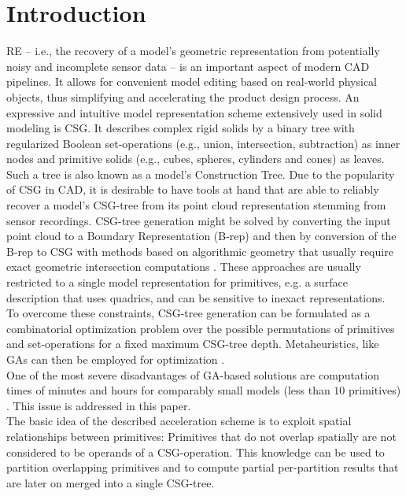 \section{Introduction}
\ac{RE} -- i.e., the recovery of a model's geometric representation from potentially noisy and incomplete sensor data -- is an important aspect of modern \ac{CAD} pipelines. 
It allows for convenient model editing based on real-world physical objects, thus simplifying and accelerating the product design process.
An expressive and intuitive model representation scheme extensively used in solid modeling is \ac{CSG}.
It describes complex rigid solids by a binary tree with regularized Boolean set-operations (e.g., union, intersection, subtraction) as inner nodes and primitive solids (e.g., cubes, spheres, cylinders and cones) as leaves. 
Such a tree is also known as a model's Construction Tree.
Due to the popularity of \ac{CSG} in \ac{CAD}, it is desirable to have tools at hand that are able to reliably recover a model's \ac{CSG}-tree from its point cloud representation stemming from sensor recordings.
\ac{CSG}-tree generation might be solved by converting the input point cloud to a Boundary Representation (B-rep) and then by conversion of the B-rep to CSG with methods based on algorithmic geometry that usually require exact geometric intersection computations \cite{shapiro1993separation, buchele2004three}. 
These approaches are usually restricted to a single model representation for primitives, e.g. a surface description that uses quadrics, and can be sensitive to inexact representations. 
\\
To overcome these constraints, \ac{CSG}-tree generation can be formulated as a combinatorial optimization problem over the possible permutations of primitives and set-operations for a fixed maximum \ac{CSG}-tree depth.
Metaheuristics, like \acp{GA} can then be employed for optimization \cite{mitchell1998introduction}.
\\
One of the most severe disadvantages of \ac{GA}-based solutions are computation times of minutes and hours for comparably small models (less than $10$ primitives) \cite{fayolle2016evolutionary}.
This issue is addressed in this paper.  
\\
The basic idea of the described acceleration scheme is to exploit spatial relationships between primitives: 
Primitives that do not overlap spatially are not considered to be operands of a \ac{CSG}-operation.
This knowledge can be used to partition overlapping primitives and to compute partial per-partition results that are later on merged into a single \ac{CSG}-tree. 
